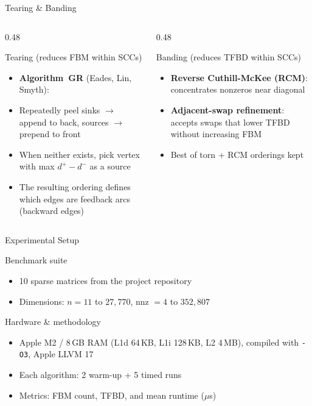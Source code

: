 \documentclass[aspectratio=169]{beamer}
\begin{document}
\begin{frame}{Tearing \& Banding}
  \begin{columns}[T]
    \begin{column}{0.48\textwidth}
      \begin{block}{Tearing (reduces FBM within SCCs)}
        \begin{itemize}
          \item \textbf{Algorithm~GR} (Eades, Lin, Smyth):
          \item Repeatedly peel sinks $\to$ append to back, sources $\to$ prepend to front
          \item When neither exists, pick vertex with max $d^+ - d^-$ as a source
          \item The resulting ordering defines which edges are feedback arcs (backward edges)
        \end{itemize}
      \end{block}
    \end{column}
    \begin{column}{0.48\textwidth}
      \begin{block}{Banding (reduces TFBD within SCCs)}
        \begin{itemize}
          \item \textbf{Reverse Cuthill-McKee (RCM)}: concentrates nonzeros near diagonal
          \item \textbf{Adjacent-swap refinement}: accepts swaps that lower TFBD without increasing FBM
          \item Best of torn + RCM orderings kept
        \end{itemize}
      \end{block}
    \end{column}
  \end{columns}
\end{frame}

\begin{frame}{Experimental Setup}
  \begin{block}{Benchmark suite}
    \begin{itemize}
      \item 10 sparse matrices from the project repository
      \item Dimensions: $n = 11$ to $27{,}770$, nnz $= 4$ to $352{,}807$
    \end{itemize}
  \end{block}
  \vspace{0.5em}
  \begin{block}{Hardware \& methodology}
    \begin{itemize}
      \item Apple M2 / 8\,GB RAM (L1d 64\,KB, L1i 128\,KB, L2 4\,MB), compiled with \texttt{-O3}, Apple LLVM 17
      \item Each algorithm: 2 warm-up + 5 timed runs
      \item Metrics: FBM count, TFBD, and mean runtime ($\mu$s)
    \end{itemize}
  \end{block}
\end{frame}
\end{document}
